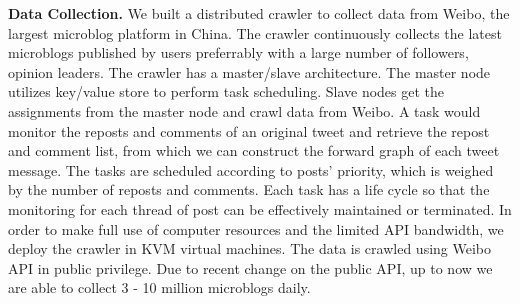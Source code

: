 

\noindent\textbf{Data Collection.}
We built a distributed crawler to collect data from Weibo, the largest microblog platform in China.
The crawler continuously collects the latest microblogs published by users preferrably with a large number of followers, \ie opinion leaders.
The crawler has a master/slave architecture.
The master node utilizes key/value store to perform task scheduling.
Slave nodes get the assignments from the master node and crawl data from Weibo.
A task would monitor the reposts and comments of an original tweet and retrieve the repost and comment list,
from which we can construct the forward graph of each tweet message.
The tasks are scheduled according to posts' priority, which is weighed by the number of reposts and comments.
Each task has a life cycle so that the monitoring for each thread of post can be effectively maintained or terminated.
In order to make full use of computer resources and the limited API bandwidth, we deploy the crawler in KVM virtual machines.
The data is crawled using Weibo API in public privilege.
Due to recent change on the public API, up to now we are able to collect 3 - 10 million microblogs daily.
